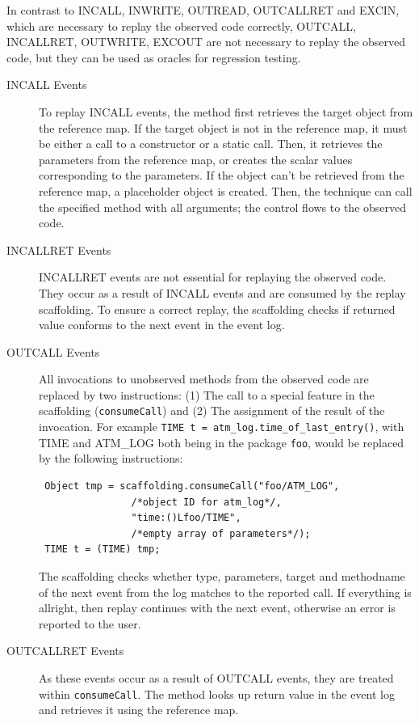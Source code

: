In contrast to INCALL, INWRITE, OUTREAD, OUTCALLRET and EXCIN, which are necessary to replay the observed code correctly, OUTCALL, INCALLRET, OUTWRITE, EXCOUT are not necessary to replay the observed code, but they can be used as oracles for regression testing. %

\begin{description}
 \item [INCALL Events] To replay INCALL events, the method first retrieves the target object from the reference map. If the target object is not in the reference map, it must be either a call to a constructor or a static call. Then, it retrieves the parameters from the reference map, or creates the scalar values corresponding to the parameters. If the object can't be retrieved from the reference map, a placeholder object is created. Then, the technique can call the specified method with all arguments; the control flows to the observed code. 
 \item [INCALLRET Events] INCALLRET events are not essential for replaying the observed code. They occur as a result of INCALL events and are consumed by the replay scaffolding. To ensure a correct replay, the scaffolding checks if returned value conforms to the next event in the event log.
 \item [OUTCALL Events] All invocations to unobserved methods from the observed code are replaced by two instructions: (1) The call to a special feature in the scaffolding (\texttt{consumeCall}) and (2) The assignment of the result of the invocation. For example \texttt{TIME t = atm\_log.time\_of\_last\_entry()}, with TIME and ATM\_LOG both being in the package \texttt{foo}, would be replaced by the following instructions:
\begin{lstlisting}
 Object tmp = scaffolding.consumeCall("foo/ATM_LOG",
                /*object ID for atm_log*/,
                "time:()Lfoo/TIME",
                /*empty array of parameters*/);
 TIME t = (TIME) tmp;
\end{lstlisting}
The scaffolding checks whether type, parameters, target and methodname of the next event from the log matches to the reported call. If everything is allright, then replay continues with the next event, otherwise an error is reported to the user.
 \item [OUTCALLRET Events]As these events occur as a result of OUTCALL events, they are treated within \texttt{consumeCall}. The method looks up return value in the event log and retrieves it using the reference map. 

\end{description}
